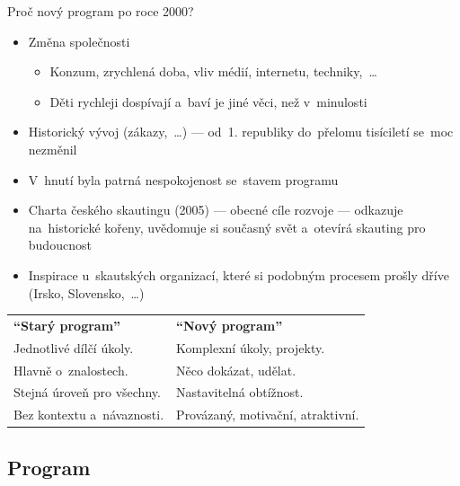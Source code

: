 \documentclass[compress, xelatex, 11pt, xcolor=dvipsnames, print, aspectratio=169,
	hyperref={
		bookmarks=true,
		unicode=true,
		colorlinks=true,
		pdftitle={Skautska vychovna metoda},
		plainpages=false,
		pdfauthor={Vojtech Zeisek},
		pdfsubject={Skautska vychovna metoda a jeji vyvoj za posledni stoleti a desetileti},
		pdfcreator={XeLaTeX},
		pdfkeywords={Junak, Pedagogika, Skaut, Skauting, Vychovna metoda},
		linkcolor=Red, %
		anchorcolor=ForestGreen, %
		citecolor=ForestGreen, %
		filecolor=ForestGreen, %
		menucolor=ForestGreen, %
		urlcolor=Sepia, %
		pdftex},
	url={hyphens, lowtilde} %
	]{beamer}
\begin{document}
\begin{frame}{Proč nový program po roce 2000?}
	\begin{itemize}
		\item Změna společnosti
		\begin{itemize}
			\item Konzum, zrychlená doba, vliv médií, internetu, techniky,~\ldots
			\item Děti rychleji dospívají a~baví je jiné věci, než v~minulosti
		\end{itemize}
		\item Historický vývoj (zákazy,~\ldots) --- od~1. republiky do~přelomu tisíciletí se~moc nezměnil
		\item V~hnutí byla patrná nespokojenost se~stavem programu
		\item Charta českého skautingu (2005) --- obecné cíle rozvoje --- odkazuje na~historické kořeny, uvědomuje si současný svět a~otevírá skauting pro budoucnost
		\item Inspirace u~skautských organizací, které si podobným procesem prošly dříve (Irsko, Slovensko,~\ldots)
	\end{itemize}
	\begin{center}
		\begin{tabular}{ll}
			\textbf{\enquote{Starý program}} & \textbf{\enquote{Nový program}}\\
			Jednotlivé dílčí úkoly. & Komplexní úkoly, projekty.\\
			Hlavně o~znalostech. & Něco dokázat, udělat.\\
			Stejná úroveň pro všechny. & Nastavitelná obtížnost.\\
			Bez kontextu a~návaznosti. & Provázaný, motivační, atraktivní.
		\end{tabular}
	\end{center}
\end{frame}

\subsection{Program}
\end{document}
